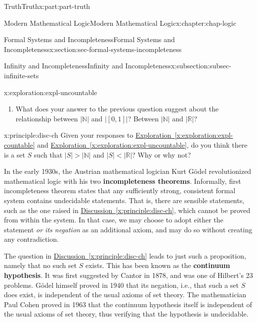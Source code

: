 \documentclass[oneside,10pt,]{book}
\newcommand{\xreffont}{\relax}
\newcommand{\terminology}[1]{\textbf{#1}}
\numberwithin{equation}{section}
\newcommand{\lt}{<}
\newcommand{\gt}{>}
\begin{document}
\begin{partptx}{Truth}{}{Truth}{}{}{x:part:part-truth}
\begin{chapterptx}{Modern Mathematical Logic}{}{Modern Mathematical Logic}{}{}{x:chapter:chap-logic}
\begin{sectionptx}{Formal Systems and Incompleteness}{}{Formal Systems and Incompleteness}{}{}{x:section:sec-formal-systems-incompleteness}
\begin{subsectionptx}{Infinity and Incompleteness}{}{Infinity and Incompleteness}{}{}{x:subsection:subsec-infinite-sets}
\begin{exploration}{}{x:exploration:expl-uncountable}
\begin{enumerate}
\item{}What does your answer to the previous question suggest about the relationship between \(|\mathbb{N}|\) and \(|[0,1]|\)? Between \(|\mathbb{N}|\) and \(|\mathbb{R}|\)?%
\end{enumerate}
\end{exploration}%
\begin{principle}{}{}{x:principle:disc-ch}%
Given your responses to \hyperref[x:exploration:expl-countable]{Exploration~{\xreffont\ref{x:exploration:expl-countable}}} and \hyperref[x:exploration:expl-uncountable]{Exploration~{\xreffont\ref{x:exploration:expl-uncountable}}}, do you think there is a set \(S\) such that \(|S| \gt |\mathbb{N}|\) and \(|S| \lt |\mathbb{R}|\)? Why or why not?%
\end{principle}
 In the early 1930s, the Austrian mathematical logician Kurt Gödel revolutionized mathematical logic with his two \terminology{incompleteness theorems}. Informally, first incompleteness theorem states that any sufficiently strong, consistent formal system contains undecidable statements. That is, there are sensible statements, such as the one raised in \hyperref[x:principle:disc-ch]{Discussion~{\xreffont\ref{x:principle:disc-ch}}}, which cannot be proved from within the system. In that case, we may choose to adopt either the statement \emph{or its negation} as an additional axiom, and may do so without creating any contradiction.%
\par
The question in \hyperref[x:principle:disc-ch]{Discussion~{\xreffont\ref{x:principle:disc-ch}}} leads to just such a proposition, namely that no such set \(S\) exists. This has been known as the \terminology{continuum hypothesis}. It was first suggested by Cantor in 1878, and was one of Hilbert's 23 problems. Gödel himself proved in 1940 that its negation, i.e., that such a set \(S\) does exist, is independent of the usual axioms of set theory. The mathematician Paul Cohen proved in 1963 that the continuum hypothesis itself is independent of the usual axioms of set theory, thus verifying that the hypothesis is undecidable.%
\end{subsectionptx}
\begin{conclusion}{}%

\end{conclusion}
\end{sectionptx}
\end{chapterptx}
\end{partptx}
\end{document}
